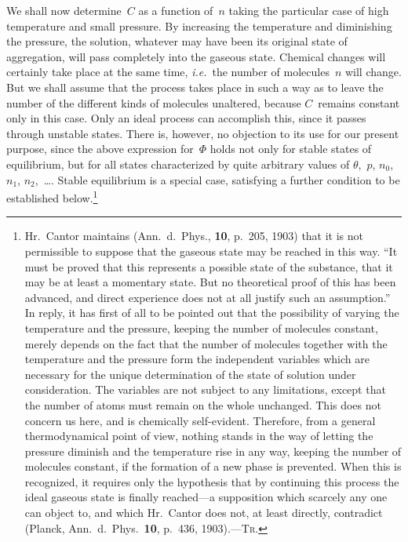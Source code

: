 \documentclass[12pt]{book}[2005/09/16]
\newcommand{\Typo}[2]{#2}
\newcommand{\Chg}[2]{#2}
\newcommand{\Add}[1]{\Chg{}{#1}}
\newcommand{\PageSep}[1]{\ignorespaces}
\newcommand{\ie}{\emph{i.e.}}
\newcommand{\Tr}{\textsc{Tr}}
\begin{document}
We shall now determine~$C$ as a function of~$n$ taking
the particular case of high temperature and small pressure.
By increasing the temperature and diminishing the
pressure, the solution, whatever may have been its original
state of aggregation, will pass completely into the gaseous
state. Chemical changes will certainly take place at the
same time, \ie\ the number of molecules~$n$ will change. But
we shall assume that the process takes place in such a way
as to leave the number of the different kinds of molecules
unaltered, because $C$~remains constant only in this case.
Only an ideal process can accomplish this, since it passes
through unstable states. There is, however, no objection to
its use for our present purpose, since the above expression
for~$\Phi$ holds not only for stable states of equilibrium, but for
all states characterized by quite arbitrary values of $\theta$,~$p$, $n_{0}$,~$n_{1}$,
$n_{2}$,~\dots\Add{.} Stable equilibrium is a special case, satisfying
%
\Typo{\index{Planck}}{}%
a further condition to be established below.\footnote
  {Hr.~Cantor maintains (Ann.\ d.\ Phys., \textbf{10}, p.~205, 1903) that it is not permissible
  to suppose that the gaseous state may be reached in this way. ``It
  must be proved that this represents a possible state of the substance, that it
  may be at least a momentary state. But no theoretical proof of this has
  been advanced, and direct experience does not at all justify such an assumption.''
  In reply, it has first of all to be pointed out that the possibility of
  varying the temperature and the pressure, keeping the number of molecules
  constant, merely depends on the fact that the number of molecules together
  with the temperature and the pressure form the independent variables which
  are necessary for the unique determination of the state of solution under
  consideration. The variables are not subject to any limitations, except that
  the number of atoms must remain on the whole unchanged. This does not
  concern us here, and is chemically self-evident. Therefore, from a general
  thermodynamical point of view, nothing stands in the way of letting the
  pressure diminish and the temperature rise in any way, keeping the number
  of molecules constant, if the formation of a new phase is prevented. When
  this is recognized, it requires only the hypothesis that by continuing this
  process the ideal gaseous state is finally reached---a supposition which scarcely
  any one can object to, and which Hr.~Cantor does not, at least directly, contradict
  (Planck, Ann.\ d.\ Phys.\ \textbf{10}, p.~436, 1903).---\Tr.}
\PageSep{228}
\end{document}

